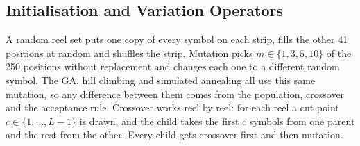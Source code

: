 \subsection{Initialisation and Variation Operators}
\label{sec:operators}

A random reel set puts one copy of every symbol on each strip, fills the other 41 positions at random and shuffles the strip. Mutation picks $m \in \{1, 3, 5, 10\}$ of the 250 positions without replacement and changes each one to a different random symbol. The GA, hill climbing and simulated annealing all use this same mutation, so any difference between them comes from the population, crossover and the acceptance rule. Crossover works reel by reel: for each reel a cut point $c \in \{1, \dots, L-1\}$ is drawn, and the child takes the first $c$ symbols from one parent and the rest from the other. Every child gets crossover first and then mutation.
